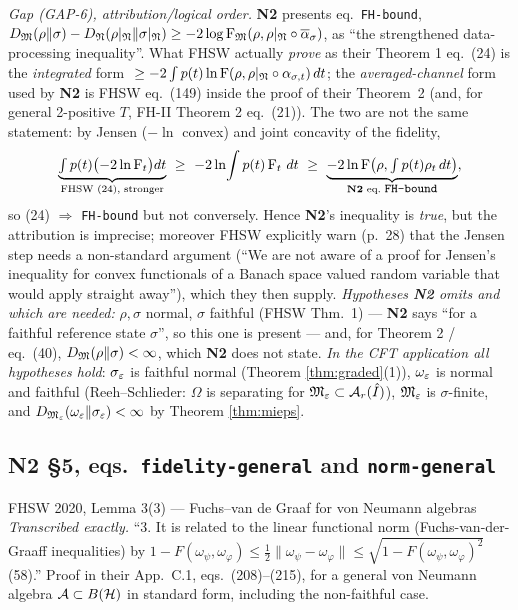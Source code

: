 \documentclass[11pt]{article}
\newcommand{\Ar}{\mathcal A_r}
\newcommand{\NII}{\textbf{N2}}
\newcommand{\loc}[1]{{\small\texttt{#1}}}
\newcommand{\1}{\mathbf 1}
\begin{document}
\begin{verdictgap}
\emph{Gap (GAP-6), attribution/logical order.} \NII{} presents eq.~\loc{FH-bound},
$D_{\mathfrak M}(\rho\|\sigma)-D_{\mathfrak N}(\rho|_{\mathfrak N}\|\sigma|_{\mathfrak N})\ge-2\log \operatorname{F}_{\mathfrak M}(\rho,\rho|_{\mathfrak N}\circ\overline\alpha_\sigma)$,
as ``the strengthened data-processing inequality''. What FHSW actually \emph{prove} as their
Theorem 1 eq.~(24) is the \emph{integrated} form $\ \ge-2\int p(t)\ln \operatorname{F}(\rho,\rho|_{\mathfrak N}\circ\alpha_{\sigma,t})\,dt$;
the \emph{averaged-channel} form used by \NII{} is FHSW eq.~(149) inside the proof of their Theorem~2
(and, for general 2-positive $T$, FH-II Theorem 2 eq.~(21)). The two are not the same statement:
by Jensen ($-\ln$ convex) and joint concavity of the fidelity,
\[
 \underbrace{\textstyle\int p(t)\bigl(-2\ln \Fid_t\bigr)dt}_{\text{FHSW (24), stronger}}
 \ \ge\ -2\ln\!\int p(t)\Fid_t\,dt\ \ge\
 \underbrace{-2\ln \Fid\bigl(\rho,\textstyle\int p(t)\rho_t\,dt\bigr)}_{\text{\NII{} eq.~\loc{FH-bound}}},
\]
so (24) $\Rightarrow$ \loc{FH-bound} but not conversely. Hence \NII's inequality is \emph{true}, but the
attribution is imprecise; moreover FHSW explicitly warn (p.~28) that the Jensen step needs a
non-standard argument (``We are not aware of a proof for Jensen's inequality for convex functionals
of a Banach space valued random variable that would apply straight away''), which they then supply.
\emph{Hypotheses \NII{} omits and which are needed:} $\rho,\sigma$ normal, $\sigma$ faithful
(FHSW Thm.~1) --- \NII{} says ``for a faithful reference state $\sigma$'', so this one is present ---
and, for Theorem 2 / eq.~(40), $D_{\mathfrak M}(\rho\|\sigma)<\infty$, which \NII{} does not state.
\emph{In the CFT application all hypotheses hold}: $\sigma_\varepsilon$ is faithful normal
(Theorem \ref{thm:graded}(1)), $\omega_\varepsilon$ is normal and faithful (Reeh--Schlieder: $\Omega$ is
separating for $\cM_\eps\subset\Ar(\hat I)$), $\mathfrak M_\varepsilon$ is $\sigma$-finite, and
$D_{\mathfrak M_\varepsilon}(\omega_\varepsilon\|\sigma_\varepsilon)<\infty$ by Theorem \ref{thm:mieps}.
\end{verdictgap}

\subsection{N2 \S5, eqs.\ \loc{fidelity-general} and \loc{norm-general}}

\begin{citedbox}{FHSW 2020, Lemma 3(3) --- Fuchs--van de Graaf for von Neumann algebras}
\emph{Transcribed exactly.} ``3. It is related to the linear functional norm (Fuchs-van-der-Graaff
inequalities) by
$1-F(\omega_\psi,\omega_\varphi)\le\frac12\|\omega_\psi-\omega_\varphi\|\le\sqrt{1-F(\omega_\psi,\omega_\varphi)^2}$ (58).''
Proof in their App.~C.1, eqs.~(208)--(215), for a general von Neumann algebra $\mathcal A\subset B(\mathcal H)$
in standard form, including the non-faithful case.\\[2pt]
\end{citedbox}
\end{document}
